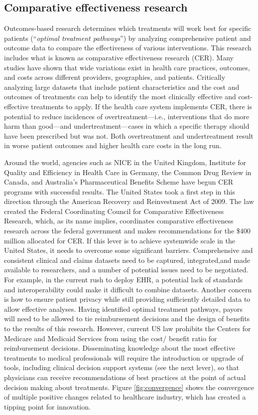 \documentclass[twocolumn]{article}
\begin{document}
\subsection{Comparative effectiveness research}
Outcomes-based research determines which treatments will work best for specific patients (“\textit{optimal treatment pathways}”) by analyzing comprehensive patient and outcome data to compare the effectiveness of various interventions. This research includes what is known as comparative effectiveness research (CER). Many studies have shown that wide variations exist in health care practices, outcomes, and costs across different providers, geographies, and patients. Critically analyzing large datasets that include patient characteristics and the cost and outcomes of treatments can help to identify the most clinically effective and cost-effective treatments to apply. If the health care system implements CER, there is potential to reduce incidences of overtreatment—i.e., interventions that do more harm than good—and undertreatment—cases in which a specific therapy should have been prescribed but was not. Both overtreatment and undertreatment result in worse patient outcomes and higher health care costs in the long run. 

Around the world, agencies such as NICE in the United Kingdom, 
Institute for Quality and Efficiency in Health Care in Germany, the Common Drug Review in Canada, and Australia’s Pharmaceutical Benefits Scheme have begun CER programs with successful results. The United States took a first step in this direction through the American Recovery and Reinvestment Act of 2009. The law created the Federal Coordinating Council for Comparative Effectiveness Research, which, as its name implies, coordinates comparative effectiveness research across the federal government and makes recommendations for the \$400 million allocated for CER. If this lever is to achieve systemwide scale in the United States, it needs to overcome some significant barriers. Comprehensive and consistent clinical and claims datasets need to be captured, integrated,and made available to researchers, and a number of potential issues need to be negotiated. For example, in the current rush to deploy EHR, a potential lack of standards and interoperability could make it difficult to combine datasets. Another concern is how to ensure patient privacy while still providing sufficiently detailed data to allow effective analyses. Having identified optimal treatment pathways, payors will need to be allowed to tie reimbursement decisions and the design of benefits to the results of this research. However, current US law prohibits the Centers for Medicare and Medicaid Services from using the cost/ benefit ratio for reimbursement decisions. Disseminating knowledge about the most effective treatments to medical professionals will require the introduction or upgrade of tools, including clinical decision support systems (see the next lever), so that physicians can receive recommendations of best practices at the point of actual decision making about treatments.
Figure \ref{fig:convergence} shows the convergence of multiple positive changes related to healthcare industry, which has created a tipping point for innovation.
\end{document}
